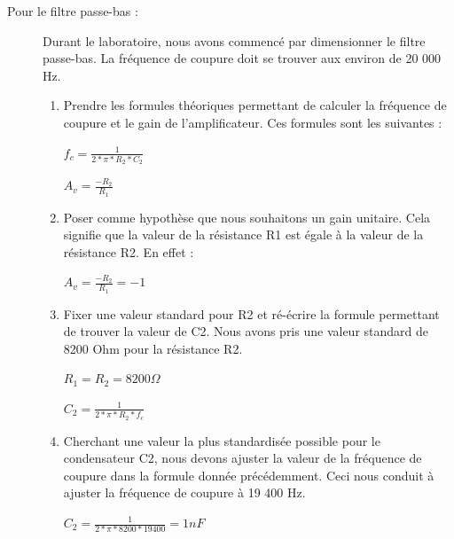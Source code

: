 \documentclass[10pt, oneside, a4paper]{article}
\begin{document}
\begin{description}
\item[ Pour le filtre passe-bas :] Durant le laboratoire, nous avons commencé par dimensionner le filtre passe-bas. La fréquence de coupure doit se trouver aux environ de 20 000 Hz.
	\begin{enumerate}
		\item Prendre les formules théoriques permettant de calculer la fréquence de coupure et le gain de l'amplificateur. Ces formules sont les suivantes : 
			\begin{center} $f_{c}=\frac{1}{2*\pi*R_{2}*C_{2}}$ \end{center} 
			\begin{center} $A_{v}=\frac{-R_{2}}{R_{1}}$ \end{center} 
		\item Poser comme hypothèse que nous souhaitons un gain unitaire. Cela signifie que la valeur de la résistance R1 est égale à la valeur de la résistance R2. En effet : \begin{center} $A_{v}=\frac{-R_{2}}{R_{1}} = -1$ \end{center} 
		\item Fixer une valeur standard pour R2 et ré-écrire la formule permettant de trouver la valeur de C2. Nous avons pris une valeur standard de 8200 Ohm pour la résistance R2.
			\begin{center} $R_{1}= R_{2} = 8 200\Omega $ \end{center}
			\begin{center} $C_{2}=\frac{1}{2*\pi*R_{2}*f_{c}}$ \end{center} 
		\item Cherchant une valeur la plus standardisée possible pour le condensateur C2, nous devons ajuster la valeur de la fréquence de coupure dans la formule donnée précédemment. Ceci nous conduit à ajuster la fréquence de coupure à 19 400 Hz.
			\begin{center} $C_{2}=\frac{1}{2*\pi*8 200*19 400}= 1 nF$ \end{center} 
	\end{enumerate}
\end{description}
\end{document}
